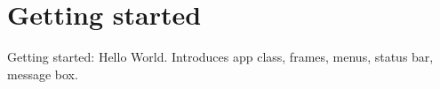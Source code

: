 \chapter{Getting started}\label{gettingstarted}
%
%
\setfooter{\thepage}{}{}{}{}{\thepage}%

Getting started: Hello World. Introduces app class, frames, menus, status bar, message box.

